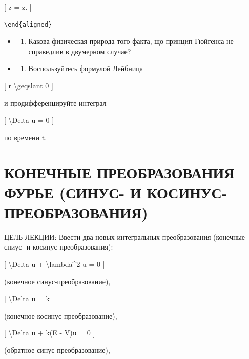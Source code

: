 \documentclass[
]{article}
\providecommand{\tightlist}{%
  \setlength{\itemsep}{0pt}\setlength{\parskip}{0pt}}
\begin{document}
{[} z = z. {]}

\begin{verbatim}
\end{aligned}
\end{verbatim}

\begin{itemize}
\tightlist
\item
  \begin{enumerate}
  \def\labelenumi{\arabic{enumi}.}
  \setcounter{enumi}{5}
  \tightlist
  \item
    Какова физическая природа того факта, що принцип Гюйгенса не
    справедлив в двумерном случае?
  \end{enumerate}
\item
  \begin{enumerate}
  \def\labelenumi{\arabic{enumi}.}
  \setcounter{enumi}{6}
  \tightlist
  \item
    Воспользуйтесь формулой Лейбница
  \end{enumerate}
\end{itemize}

{[} r \textbackslash geqslant 0 {]}

и продифференцируйте интеграл

{[} \textbackslash Delta u = 0 {]}

по времени t.

\section{КОНЕЧНЫЕ ПРЕОБРАЗОВАНИЯ ФУРЬЕ (СИНУС- И
КОСИНУС-ПРЕОБРАЗОВАНИЯ)}\label{ux43aux43eux43dux435ux447ux43dux44bux435-ux43fux440ux435ux43eux431ux440ux430ux437ux43eux432ux430ux43dux438ux44f-ux444ux443ux440ux44cux435-ux441ux438ux43dux443ux441--ux438-ux43aux43eux441ux438ux43dux443ux441-ux43fux440ux435ux43eux431ux440ux430ux437ux43eux432ux430ux43dux438ux44f}

ЦЕЛЬ ЛЕКЦИИ: Ввести два новых интегральных преобразования (конечные
спиус- и косинус-преобразования):

{[} \textbackslash Delta u + \textbackslash lambda\^{}2 u = 0 {]}

(конечное синус-преобразование),

{[} \textbackslash Delta u = k {]}

(конечное косинус-преобразование),

{[} \textbackslash Delta u + k(E - V)u = 0 {]}

(обратное синус-преобразование),
\end{document}
